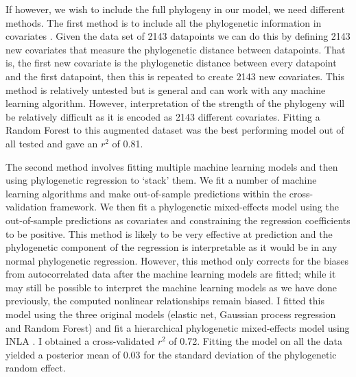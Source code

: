 \documentclass[10pt,]{article}
\begin{document}
If however, we wish to include the full phylogeny in our model, we need different methods. The first method is to include all the phylogenetic information in covariates \citep{hengl2018random}. Given the data set of 2143 datapoints we can do this by defining 2143 new covariates that measure the phylogenetic distance between datapoints. That is, the first new covariate is the phylogenetic distance between every datapoint and the first datapoint, then this is repeated to create 2143 new covariates. This method is relatively untested but is general and can work with any machine learning algorithm. However, interpretation of the strength of the phylogeny will be relatively difficult as it is encoded as 2143 different covariates. Fitting a Random Forest to this augmented dataset was the best performing model out of all tested and gave an \(r^2\) of 0.81.

The second method involves fitting multiple machine learning models and then using phylogenetic regression to `stack' them. We fit a number of machine learning algorithms and make out-of-sample predictions within the cross-validation framework. We then fit a phylogenetic mixed-effects model using the out-of-sample predictions as covariates and constraining the regression coefficients to be positive. This method is likely to be very effective at prediction and the phylogenetic component of the regression is interpretable as it would be in any normal phylogenetic regression. However, this method only corrects for the biases from autocorrelated data after the machine learning models are fitted; while it may still be possible to interpret the machine learning models as we have done previously, the computed nonlinear relationships remain biased. I fitted this model using the three original models (elastic net, Gaussian process regression and Random Forest) and fit a hierarchical phylogenetic mixed-effects model using INLA \citep{INLA}. I obtained a cross-validated \(r^2\) of 0.72. Fitting the model on all the data yielded a posterior mean of 0.03 for the standard deviation of the phylogenetic random effect.
\end{document}

